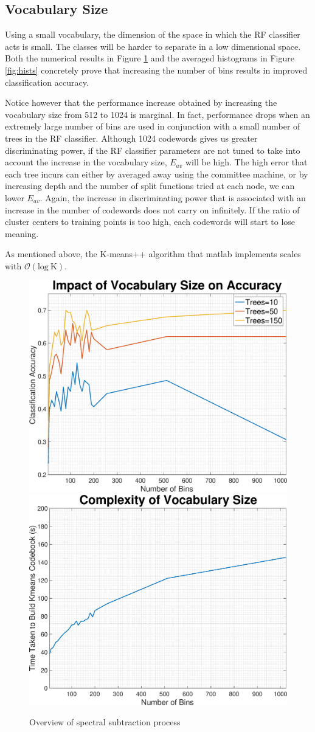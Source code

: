 \documentclass[a4paper,pra,twocolumn,10pt,aps,longbibliography,nobalancelastpage]{revtex4-1}
\begin{document}
\subsection*{Vocabulary Size}

Using a small vocabulary, the dimension of the space in which the RF classifier acts is small. The classes will be harder to separate in a low dimensional space. Both the numerical results in Figure \ref{fig:bins_acc} and the averaged histograms in Figure \ref{fig:hists} concretely prove that increasing the number of bins results in improved classification accuracy.

Notice however that the performance increase obtained by increasing the vocabulary size from 512 to 1024 is marginal. In fact, performance drops when an extremely large number of bins are used in conjunction with a small number of trees in the RF classifier. Although 1024 codewords gives us greater discriminating power, if the RF classifier parameters are not tuned to take into account the increase in the vocabulary size, $E_{av}$ will be high. The high error that each tree incurs can either by averaged away using the committee machine, or by increasing depth and the number of split functions tried at each node, we can lower $E_{av}$. Again, the increase in discriminating power that is associated with an increase in the number of codewords does not carry on infinitely. If the ratio of cluster centers to training points is too high, each codewords will start to lose meaning. 

As mentioned above, the K-means++ algorithm that matlab implements scales with $\mathcal{O}(\text{log} \ \text{K})$.

\begin{figure}[H]
	\centering
    \includegraphics[width=0.49\columnwidth]{numBins_acc}
	\includegraphics[width=0.49\columnwidth]{numBins_complexity}
    \caption{Overview of spectral subtraction process}
    \label{fig:bins_acc}
\end{figure}
\end{document}
